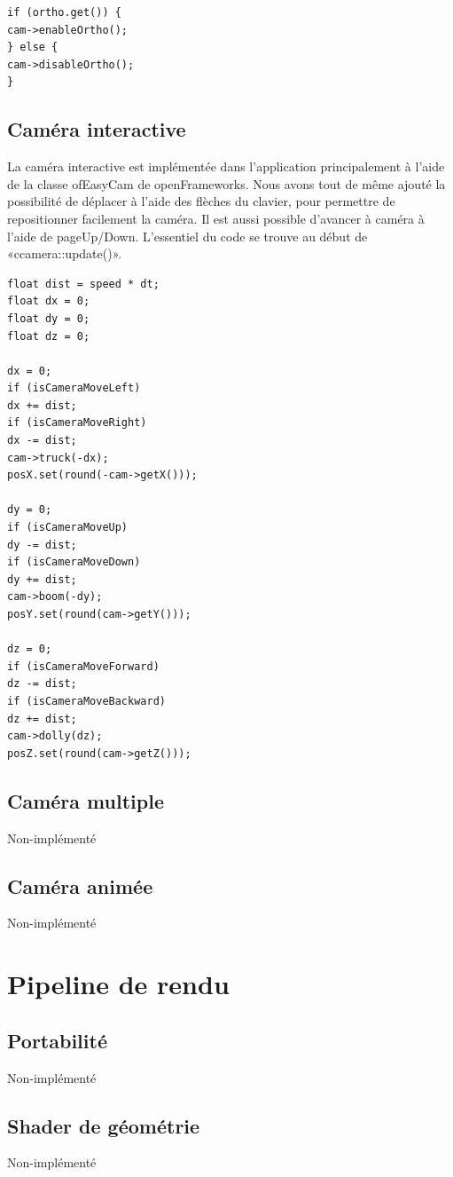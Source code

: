 \begin{lstlisting}
if (ortho.get()) {
cam->enableOrtho();
} else {
cam->disableOrtho();
}
\end{lstlisting}

\subsection{Caméra interactive}
La caméra interactive est implémentée dans l'application principalement à l'aide de la classe ofEasyCam de openFrameworks. Nous avons tout de même ajouté la possibilité de déplacer à l'aide des flèches du clavier, pour permettre de repositionner facilement la caméra. Il est aussi possible d'avancer à caméra à l'aide de pageUp/Down. L'essentiel du code se trouve au début de «ccamera::update()».

\begin{lstlisting}
float dist = speed * dt;
float dx = 0;
float dy = 0;
float dz = 0;

dx = 0;
if (isCameraMoveLeft)
dx += dist;
if (isCameraMoveRight)
dx -= dist;
cam->truck(-dx);
posX.set(round(-cam->getX()));

dy = 0;
if (isCameraMoveUp)
dy -= dist;
if (isCameraMoveDown)
dy += dist;
cam->boom(-dy);
posY.set(round(cam->getY()));

dz = 0;
if (isCameraMoveForward)
dz -= dist;
if (isCameraMoveBackward)
dz += dist;
cam->dolly(dz);
posZ.set(round(cam->getZ()));
\end{lstlisting}

\subsection{Caméra multiple}
Non-implémenté

\subsection{Caméra animée}
Non-implémenté


\pagebreak
\section{Pipeline de rendu}
\subsection{Portabilité}
Non-implémenté

\subsection{Shader de géométrie}
Non-implémenté

